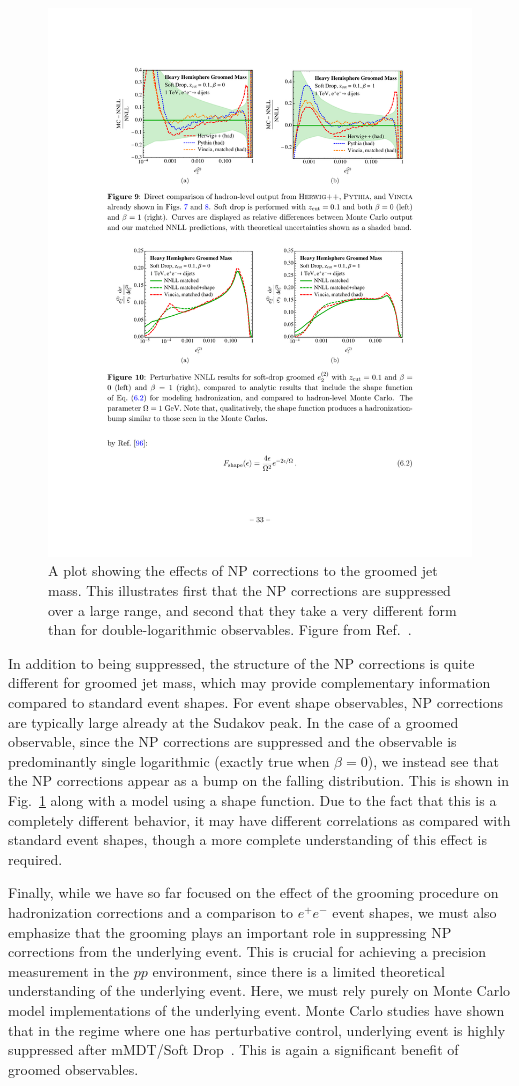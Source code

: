 \documentclass[11pt]{cernrep}
\begin{document}
\begin{figure}[t]
\begin{center}
\includegraphics[width = 0.5\columnwidth]{jetsub_alphas_shape_function.pdf}
\end{center}
\caption{A plot showing the effects of NP corrections to the groomed jet mass. This illustrates first that the NP corrections are suppressed over a large range, and second that they take a very different form than for double-logarithmic observables. Figure from Ref.~\cite{Frye:2016aiz}.}
\label{jetsub_alphas_fig:shape_function}
\end{figure}

In addition to being suppressed, the structure of the NP corrections is quite different for groomed jet mass, which may provide complementary information compared to standard event shapes.
%
For event shape observables, NP corrections are typically large already at the Sudakov peak.
%
In the case of a groomed observable, since the NP corrections are suppressed and the observable is predominantly single logarithmic (exactly true when $\beta=0$), we instead see that the NP corrections appear as a bump on the falling distribution.
%
This is shown in Fig.~\ref{jetsub_alphas_fig:shape_function} along with a model using a shape function.
%
Due to the fact that this is a completely different behavior, it may have different correlations as compared with standard event shapes, though a more complete understanding of this effect is required. 

Finally, while we have so far focused on the effect of the grooming procedure on hadronization corrections and a comparison to $e^+e^-$ event shapes, we must also emphasize that the grooming plays an important role in suppressing NP corrections from the underlying event.
%
This is crucial for achieving a precision measurement in the $pp$ environment, since there is a limited theoretical understanding of the underlying event.
%
Here, we must rely purely on Monte Carlo model implementations of the underlying event.
%
Monte Carlo studies have shown that in the regime where one has perturbative control, underlying event is highly suppressed after mMDT/Soft Drop~\cite{Dasgupta:2013ihk,Larkoski:2014wba}.
%
This is again a significant benefit of groomed observables. 
\end{document}
